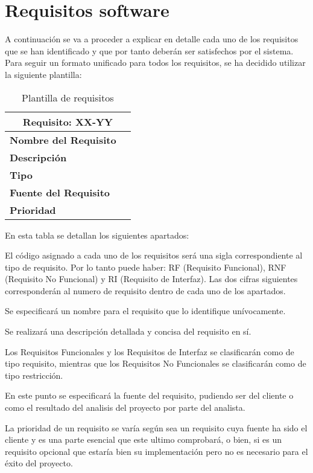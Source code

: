 \section{Requisitos software}\label{sec:sw_req}

\par A continuación se va a proceder a explicar en detalle cada uno de los requisitos que se han identificado y que por tanto deberán ser satisfechos por el sistema. Para seguir un formato unificado para todos los requisitos, se ha decidido utilizar la siguiente plantilla:
\begin{table}[H]
\begin{center}
\begin{tabular}{p{} p{7cm}}
\multicolumn{2}{c}{\textbf{Requisito: XX-YY} } \\
\hline \hline
\textbf{Nombre del Requisito} &   \\
\hline
\textbf{Descripción} &  \\
\hline
\textbf{Tipo} &  \\
\hline
\textbf{Fuente del Requisito} &   \\
\hline
\textbf{Prioridad} &   \\ \hline
\end{tabular}
\caption{Plantilla de requisitos}
\label{tab:Plantilla-Requisitos}
\end{center}
\end{table}

\par En esta tabla se detallan los siguientes apartados:
\begin{description}[style=multiline, leftmargin=4cm]
\item[\textbf{Requisito XX-YY:}] El código asignado a cada uno de los requisitos será una sigla correspondiente al tipo de requisito. Por lo tanto puede haber: RF (Requisito Funcional), RNF (Requisito No Funcional) y RI (Requisito de Interfaz). Las dos cifras siguientes corresponderán al numero de requisito dentro de cada uno de los apartados.
\item[\textbf{Nombre del Requisito:}] Se especificará un nombre para el requisito que lo identifique unívocamente.
\item[\textbf{Descripción:}] Se realizará una descripción detallada y concisa del requisito en sí.
\item[\textbf{Tipo:}] Los Requisitos Funcionales y los Requisitos de Interfaz se clasificarán como de tipo requisito, mientras que los Requisitos No Funcionales se clasificarán como de tipo restricción.
\item[\textbf{Fuente del Requisito:}] En este punto se especificará la fuente del requisito, pudiendo ser del cliente o como el resultado del analisis del proyecto por parte del analista.
\item[\textbf{Prioridad:}] La prioridad de un requisito se varía según sea un requisito cuya fuente ha sido el cliente y es una parte esencial que este ultimo comprobará, o bien, si es un requisito opcional que estaría bien su implementación pero no es necesario para el éxito del proyecto.
\end{description}


